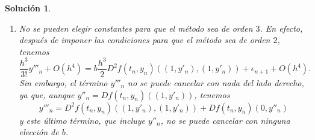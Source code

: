 \documentclass[11pt]{article}
\newtheorem*{sol}{Solución}
\begin{document}
\begin{sol}
\begin{enumerate}
\begin{equation}
      \end{equation}
      Como vimos antes, para que el método sea de orden $1$ (al
      menos), debemos pedir que $a+b=1$, con lo cual se cancelan los
      primeros dos términos de cada lado.
      Además, si $\alpha=\beta$, entonces podemos sacar $\alpha$ del
      término de orden $2$, el cual se convierte en un múltiplo de
      $Df(t_n,y_n)((1,y'_n))=y''_n$, es decir:
      \begin{equation}
          y_n + hy'_{n} + \frac{h^{2}}{2}y''_n + O(h^{3})
          = y_{n}
          + hy'_n
          + \alpha bh^{2} y''_n
          + O(h^{3})
          + \epsilon_{n+1}.
      \end{equation}
      Los primeros dos términos se cancelan. Finalmente, si requerimos
      que $\alpha b=\frac{1}{2}$, entonces el tercer término también
      se cancela, con lo cual obtenemos $\epsilon_{n+1}=O(h^{3})$.
      Luego,
      \begin{equation}
        \tau_{n+1}(h) = \frac{\epsilon_{n+1}}{h} = O(h^{2})
      .\end{equation}
      En resumen, para que el método sea de orden $2$, las condiciones
      son $a+b=1$ y $\alpha=\beta=\frac{1}{2b}$.
    \item
    No se pueden elegir constantes para que el método sea de orden
    $3$. En efecto, después de imponer las condiciones para que el
    método sea de orden $2$, tenemos
    \begin{equation}\label{eq:nosepuede}
      \frac{h^{3}}{3!}y'''_n + O(h^{4})
      = b\frac{h^{3}}{2}D^{2}f(t_n,y_n)((1,y'_n),(1,y'_n))
      + \epsilon_{n+1}
      + O(h^{4})
    .\end{equation}
    Sin embargo, el término $y'''_n$ no se puede cancelar con nada del
    lado derecho, ya que, aunque $y''_n = Df(t_n,y_n)((1,y'_n))$,
    tenemos
    \begin{equation}
      y'''_n = D^{2}f(t_n,y_n)((1,y'_n),(1,y'_n)) +
      Df(t_n,y_n)(0,y''_n)
    \end{equation}
    y este último término, que incluye $y''_n$, no se puede cancelar
    con ninguna elección de $b$.

  \end{enumerate}
\end{sol}
\end{document}
